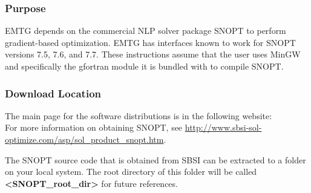 
\subsubsection{Purpose}
\noindent \ac{EMTG} depends on the commercial \ac{NLP} solver package \ac{SNOPT} to perform gradient-based optimization. \ac{EMTG} has interfaces known to work for \ac{SNOPT} versions 7.5, 7.6, and 7.7. These instructions assume that the user uses MinGW and specifically the gfortran module it is bundled with to compile \ac{SNOPT}.

\subsubsection{Download Location}
\noindent The main page for the software distributions is in the following website: \\
For more information on obtaining \ac{SNOPT}, see \url{http://www.sbsi-sol-optimize.com/asp/sol_product_snopt.htm}.

\noindent The SNOPT source code that is obtained from SBSI can be extracted to a folder on your local system. The root directory of this folder will be called \textbf{\textless SNOPT\_root\_dir\textgreater} for future references.